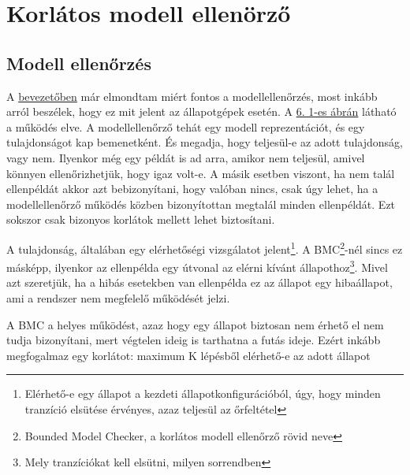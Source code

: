 \chapter{Korlátos modell ellenörző}
\label{sec:bmc}
\section{Modell ellenőrzés}
A \hyperref[sec:intro]{bevezetőben} már elmondtam miért fontos a modellellenőrzés, most inkább arról beszélek, hogy ez mit jelent az állapotgépek esetén. A \hyperref[fig:mcheck]{6. 1-es ábrán} látható a működés elve. A modellellenőrző tehát egy modell reprezentációt, és egy tulajdonságot kap bemenetként. És megadja, hogy teljesül-e az adott tulajdonság, vagy nem. Ilyenkor még egy példát is ad arra, amikor nem teljesül, amivel könnyen ellenőrizhetjük, hogy igaz volt-e. A másik esetben viszont, ha nem talál ellenpéldát akkor azt bebizonyítani, hogy valóban nincs, csak úgy lehet, ha a modellellenőrző működés közben bizonyítottan megtalál minden ellenpéldát. Ezt sokszor csak bizonyos korlátok mellett lehet biztosítani.

A tulajdonság, általában egy elérhetőségi vizsgálatot jelent\footnote{Elérhető-e egy állapot a kezdeti állapotkonfigurációból, úgy, hogy minden tranzíció elsütése érvényes, azaz teljesül az őrfeltétel}. A BMC\footnote{Bounded Model Checker, a korlátos modell ellenőrző rövid neve}-nél sincs ez másképp, ilyenkor az ellenpélda egy útvonal az elérni kívánt állapothoz\footnote{Mely tranzíciókat kell elsütni, milyen sorrendben}. Mivel azt szeretjük, ha a hibás esetekben van ellenpélda ez az állapot egy hibaállapot, ami a rendszer nem megfelelő működését jelzi.

A BMC a helyes működést, azaz hogy egy állapot biztosan nem érhető el nem tudja bizonyítani, mert végtelen ideig is tarthatna a futás ideje. Ezért inkább megfogalmaz egy korlátot: maximum K lépésből elérhető-e az adott állapot

